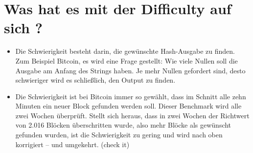 \documentclass[ngerman]{scrreprt}
\begin{document}
\section{Was hat es mit der Difficulty auf sich ?}
\begin{itemize}
\item{Die Schwierigkeit besteht darin, die gewünschte Hash-Ausgabe zu finden. Zum Beispiel Bitcoin, es wird eine Frage gestellt: Wie viele Nullen soll die Ausgabe am Anfang des Strings haben. Je mehr Nullen gefordert sind, desto schwieriger wird es schließlich, den Output zu finden.}
\item{Die Schwierigkeit ist bei Bitcoin immer so gewählt, dass im Schnitt alle zehn Minuten ein neuer Block gefunden werden soll. Dieser Benchmark wird alle zwei Wochen überprüft. Stellt sich heraus, dass in zwei Wochen der Richtwert von 2.016 Blöcken überschritten wurde, also mehr Blöcke als gewünscht gefunden wurden, ist die Schwierigkeit zu gering und wird nach oben korrigiert – und umgekehrt. (check it)}
\end{itemize}
\end{document}
